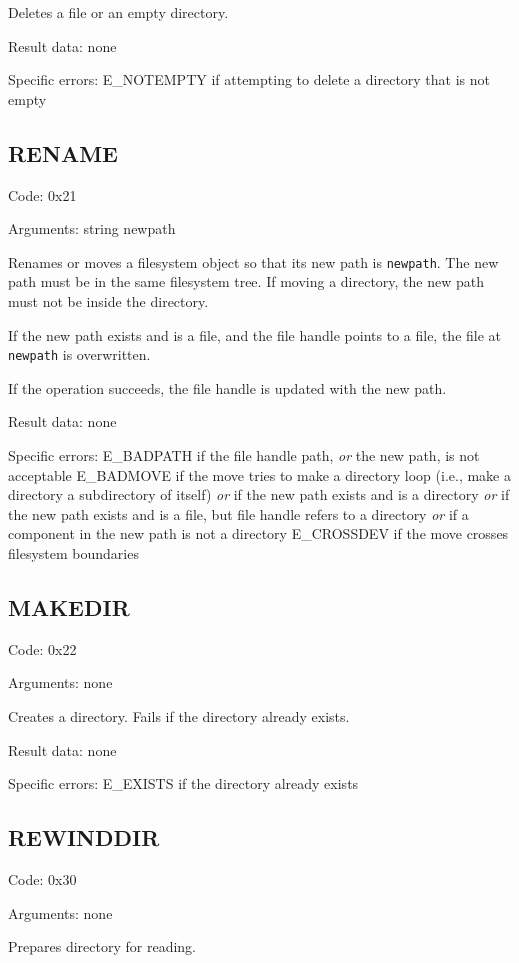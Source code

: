 Deletes a file or an empty directory.

Result data: none

Specific errors:
	E\_NOTEMPTY if attempting to delete a directory that is not empty

\subsection{RENAME}

Code: 0x21

Arguments:
string newpath

Renames or moves a filesystem object so that its new path is {\tt newpath}. The new path must be in the same
filesystem tree. If moving a directory, the new path must not be inside the directory.

If the new path exists and is a file, and the file handle points to a file, the file at {\tt newpath} is
overwritten.

If the operation succeeds, the file handle is updated with the new path.

Result data: none

Specific errors:
	E\_BADPATH if the file handle path, {\it or} the new path, is not acceptable
	E\_BADMOVE if the move tries to make a directory loop (i.e., make a directory a subdirectory of itself)
		{\it or} if the new path exists and is a directory
		{\it or} if the new path exists and is a file, but file handle refers to a directory
		{\it or} if a component in the new path is not a directory
	E\_CROSSDEV if the move crosses filesystem boundaries

\subsection{MAKEDIR}

Code: 0x22

Arguments: none

Creates a directory. Fails if the directory already exists.

Result data: none

Specific errors:
	E\_EXISTS if the directory already exists

\subsection{REWINDDIR}

Code: 0x30

Arguments: none

Prepares directory for reading.

